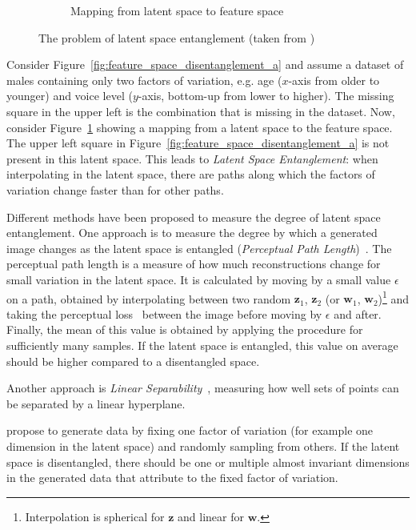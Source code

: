 \begin{figure}
\begin{subfigure}{.3\textwidth}
        \caption{Mapping from latent space to feature space}
        \label{fig:feature_space_disentanglement_b}
    \end{subfigure}
    \caption{The problem of latent space entanglement (taken from \citet{karras2019style})}
    \label{fig:feature_space_disentanglement}
\end{figure}

Consider Figure~\ref{fig:feature_space_disentanglement_a} and assume a dataset of males containing only two factors of variation, e.g. age ($x$-axis from older to younger) and voice level ($y$-axis, bottom-up from lower to higher).
The missing square in the upper left is the combination  that is missing in the dataset.
Now, consider Figure~\ref{fig:feature_space_disentanglement_b} showing a mapping from a latent space to the feature space.
The upper left square in Figure~\ref{fig:feature_space_disentanglement_a} is not present in this latent space.
This leads to \textit{Latent Space Entanglement}: when interpolating in the latent space, there are paths along which the factors of variation change faster than for other paths.

Different methods have been proposed to measure the degree of latent space entanglement.
One approach is to measure the degree by which a generated image changes as the latent space is entangled (\textit{Perceptual Path Length})~\citep{karras2019style}.
The perceptual path length is a measure of how much reconstructions change for small variation in the latent space.
It is calculated by moving by a small value $\epsilon$ on a path, obtained by interpolating between two random $\bm{z}_1$, $\bm{z}_2$ (or $\bm{w}_1$, $\bm{w}_2$)\footnote{Interpolation is spherical for $\bm{z}$ and linear for $\bm{w}$.} and taking the perceptual loss~\citep{johnson2016perceptual} between the image before moving by $\epsilon$ and after.
Finally, the mean of this value is obtained by applying the procedure for sufficiently many samples.
If the latent space is entangled, this value on average should be higher compared to a disentangled space.

Another approach is \textit{Linear Separability}~\citep{karras2019style}, measuring how well sets of points can be separated by a linear hyperplane.

\citet{kim2018disentangling} propose to generate data by fixing one factor of variation (for example one dimension in the latent space) and randomly sampling from others.
If the latent space is disentangled, there should be one or multiple almost invariant dimensions in the generated data that attribute to the fixed factor of variation.


